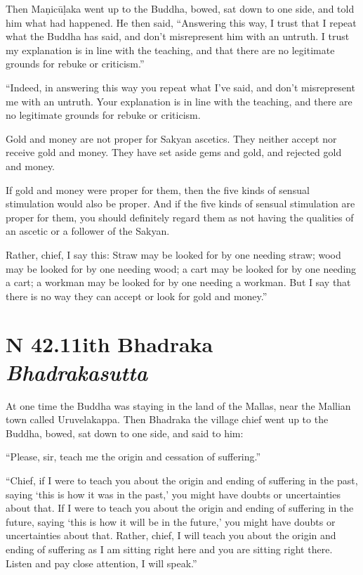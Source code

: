 \documentclass[12pt,openany]{book}%
\newcommand*{\suttatitleacronym}[1]{\smaller[2]{#1}\vspace*{.3em}}
\newcommand*{\suttatitletranslation}[1]{\linebreak{#1}}
\newcommand*{\suttatitleroot}[1]{\linebreak\smaller[2]\itshape{#1}}
\newcommand*{\tocacronym}[1]{\hspace*{-3.3em}{#1}\quad}
\newcommand*{\toctranslation}[1]{#1}
\newcommand*{\tocroot}[1]{(\textit{#1})}
\begin{document}
Then \textsanskrit{Maṇicūḷaka} went up to the Buddha, bowed, sat down to one side, and told him what had happened. He then said, “Answering this way, I trust that I repeat what the Buddha has said, and don’t misrepresent him with an untruth. I trust my explanation is in line with the teaching, and that there are no legitimate grounds for rebuke or criticism.” 

“Indeed, in answering this way you repeat what I’ve said, and don’t misrepresent me with an untruth. Your explanation is in line with the teaching, and there are no legitimate grounds for rebuke or criticism. 

Gold and money are not proper for Sakyan ascetics. They neither accept nor receive gold and money. They have set aside gems and gold, and rejected gold and money. 

If gold and money were proper for them, then the five kinds of sensual stimulation would also be proper. And if the five kinds of sensual stimulation are proper for them, you should definitely regard them as not having the qualities of an ascetic or a follower of the Sakyan. 

Rather, chief, I say this: Straw may be looked for by one needing straw; wood may be looked for by one needing wood; a cart may be looked for by one needing a cart; a workman may be looked for by one needing a workman. But I say that there is no way they can accept or look for gold and money.” 

%
\section*{{\suttatitleacronym SN 42.11}{\suttatitletranslation With Bhadraka }{\suttatitleroot Bhadrakasutta}}
\addcontentsline{toc}{section}{\tocacronym{SN 42.11} \toctranslation{With Bhadraka } \tocroot{Bhadrakasutta}}

At one time the Buddha was staying in the land of the Mallas, near the Mallian town called Uruvelakappa. Then Bhadraka the village chief went up to the Buddha, bowed, sat down to one side, and said to him: 

“Please, sir, teach me the origin and cessation of suffering.” 

“Chief, if I were to teach you about the origin and ending of suffering in the past, saying ‘this is how it was in the past,’ you might have doubts or uncertainties about that. If I were to teach you about the origin and ending of suffering in the future, saying ‘this is how it will be in the future,’ you might have doubts or uncertainties about that. Rather, chief, I will teach you about the origin and ending of suffering as I am sitting right here and you are sitting right there. Listen and pay close attention, I will speak.” 
\end{document}
